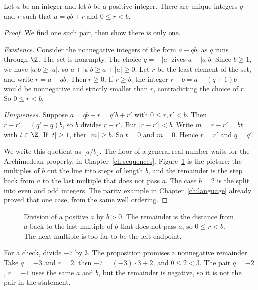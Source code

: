 \begin{propositionx}
Let $a$ be an integer and let $b$ be a positive integer. There are unique integers $q$ and $r$ such that $a=qb+r$ and $0\le r<b$.
\end{propositionx}
\begin{proof}
We find one such pair, then show there is only one.

\emph{Existence.} Consider the nonnegative integers of the form $a-qb$, as $q$ runs through $\Z$. The set is nonempty. The choice $q=-|a|$ gives $a+|a|b$. Since $b\ge1$, we have $|a|b\ge|a|$, so $a+|a|b\ge a+|a|\ge0$. Let $r$ be the least element of the set, and write $r=a-qb$. Then $r\ge0$. If $r\ge b$, the integer $r-b=a-(q+1)b$ would be nonnegative and strictly smaller than $r$, contradicting the choice of $r$. So $0\le r<b$.

\emph{Uniqueness.} Suppose $a=qb+r=q'b+r'$ with $0\le r,r'<b$. Then $r-r'=(q'-q)b$, so $b$ divides $r-r'$. But $|r-r'|<b$. Write $m=r-r'=bt$ with $t\in\Z$. If $|t|\ge 1$, then $|m|\ge b$. So $t=0$ and $m=0$. Hence $r=r'$ and $q=q'$.

We write this quotient as $\lfloor a/b\rfloor$. The floor of a general real number waits for the Archimedean property, in Chapter~\ref{ch:sequences}. Figure~\ref{fig:division} is the picture: the multiples of $b$ cut the line into steps of length $b$, and the remainder is the step back from $a$ to the last multiple that does not pass $a$. The case $b=2$ is the split into even and odd integers. The parity example in Chapter~\ref{ch:language} already proved that one case, from the same well ordering.
\end{proof}

\begin{figure}[ht]
\centering
{}
\caption{Division of a positive $a$ by $b>0$. The remainder is the distance from $a$ back to the last multiple of $b$ that does not pass $a$, so $0\le r<b$. The next multiple is too far to be the left endpoint.}
\label{fig:division}
\end{figure}

For a check, divide $-7$ by $3$. The proposition promises a nonnegative remainder. Take $q=-3$ and $r=2$: then $-7=(-3)\cdot3+2$, and $0\le2<3$. The pair $q=-2$, $r=-1$ uses the same $a$ and $b$, but the remainder is negative, so it is not the pair in the statement.

